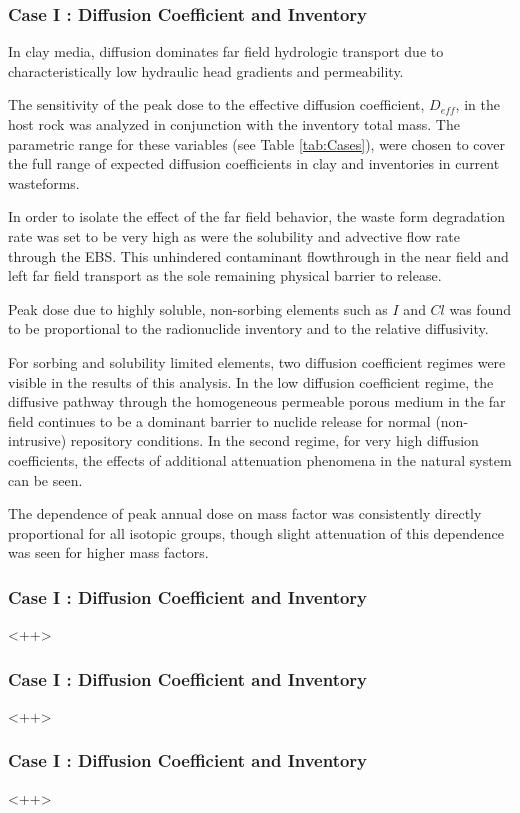 

\begin{frame}[c]
  \frametitle{Case I : Diffusion Coefficient and Inventory}
  In clay media, diffusion dominates far field hydrologic transport due to 
  characteristically low hydraulic head gradients and permeability. 

  The sensitivity of the peak dose to the effective diffusion coefficient, 
  $D_{eff}$, in the host rock was analyzed in conjunction with the inventory 
  total mass. The parametric range for these variables (see Table 
  \ref{tab:Cases}), were chosen to cover the full range of expected diffusion 
  coefficients in clay and inventories in current wasteforms.

  In order to isolate the effect of the far field behavior, the waste form 
  degradation rate was set to be very high as were the solubility and advective 
  flow rate through the  \gls{EBS}. This unhindered contaminant flowthrough 
  in the near field and left far field transport as the sole remaining physical 
  barrier to release.

  Peak dose due to highly soluble, non-sorbing elements such as $I$ and $Cl$ 
  was found to be proportional to the radionuclide inventory and 
  to the relative diffusivity. 

  For sorbing and solubility limited elements,
  two diffusion coefficient regimes were visible in the results of this 
  analysis. 
  In the low diffusion coefficient regime, the diffusive pathway through the 
  homogeneous permeable porous medium in the far field continues to be a  
  dominant 
  barrier to nuclide release for normal (non-intrusive) repository conditions.  
  In the second regime, for very high diffusion coefficients, the effects of 
  additional attenuation phenomena in the natural system can be seen. 

  The dependence of peak annual dose on mass factor was consistently directly 
  proportional for all isotopic groups, though slight attenuation of this 
  dependence was seen for higher mass factors.
\end{frame}

\begin{frame}[c]
  \frametitle{Case I : Diffusion Coefficient and Inventory}
  <++>
\end{frame}

\begin{frame}[c]
  \frametitle{Case I : Diffusion Coefficient and Inventory}
  <++>
\end{frame}

\begin{frame}[c]
  \frametitle{Case I : Diffusion Coefficient and Inventory}
  <++>
\end{frame}
